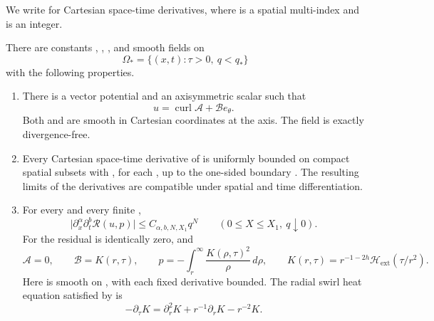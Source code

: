 We write  for Cartesian space-time derivatives, where
 is a spatial multi-index and
 is an integer.

\begin{theorem}\label{thm:3.1}
There are constants ,
, , and smooth fields on
\[
\Omega_* = \{(x,t):\tau>0,\ q<q_*\}
\]
with the following properties.
\begin{enumerate}[label=\textup{(\roman*)},leftmargin=*]
\item There is a vector potential  and an axisymmetric scalar
 such that
\begin{equation}
u=\operatorname{curl}\mathcal A+\mathcal B e_\theta.
\tag{3.3}\label{eq:3.3}
\end{equation}
Both  and  are smooth in Cartesian coordinates at the axis. The field is exactly divergence-free.

\item Every Cartesian space-time derivative of
 is uniformly bounded on compact spatial
subsets with , for each
, up to the one-sided boundary
. The resulting limits of the derivatives are compatible under spatial and time differentiation.

\item For every  and every finite
,
\begin{equation}
\lvert\partial_x^\alpha\partial_t^b\mathscr R(u,p)\rvert
\leq C_{\alpha,b,N,X_1}q^N
\qquad (0\leq X\leq X_1,\ q\downarrow0).
\tag{3.4}\label{eq:3.4}
\end{equation}
For  the residual is identically zero, and
\begin{equation}
\mathcal A=0,
\qquad \mathcal B=K(r,\tau),
\qquad p=-\int_r^\infty\frac{K(\rho,\tau)^2}{\rho}\,d\rho,
\qquad K(r,\tau)=r^{-1-2h}\mathcal H_{\mathrm{ext}}(\tau/r^2).
\tag{3.5}\label{eq:3.5}
\end{equation}
Here  is smooth on
\NSi{NS-F-P015-027}{[0,\infty)}, with each fixed derivative bounded. The radial swirl heat equation satisfied by
 is
\[
-\partial_\tau K=\partial_r^2K+r^{-1}\partial_rK-r^{-2}K.
\]


\end{enumerate}
\end{theorem}
